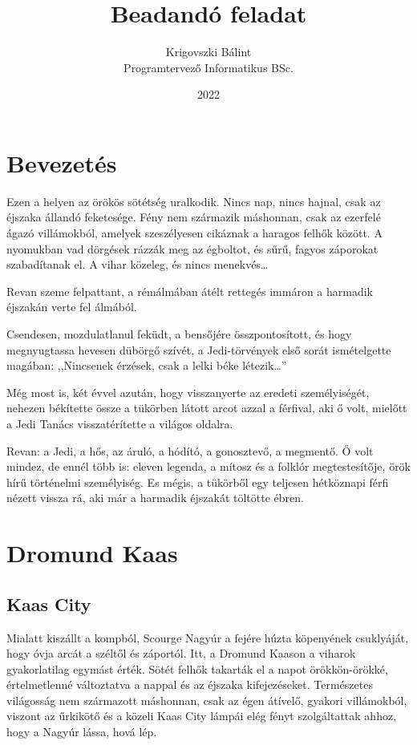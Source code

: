 \documentclass{thesis-ekf}
\theoremstyle{definition}
\begin{document}
\title{Beadandó feladat}
\author{Krigovszki Bálint\\Programtervező Informatikus BSc.}
\date{2022}
\maketitle
\tableofcontents

\chapter*{Bevezetés}
Ezen a helyen az örökös sötétség uralkodik. Nincs nap, nincs hajnal, csak az éjszaka állandó
feketesége. Fény nem származik máshonnan, csak az ezerfelé ágazó villámokból, amelyek
szeszélyesen cikáznak a haragos felhők között. A nyomukban vad dörgések rázzák meg az
égboltot, és sűrű, fagyos záporokat szabadítanak el. A vihar közeleg, és nincs menekvés\dots

Revan szeme felpattant, a rémálmában átélt rettegés immáron a harmadik éjszakán verte fel álmából.

Csendesen, mozdulatlanul feküdt, a bensőjére összpontosított, és hogy megnyugtassa
hevesen dübörgő szívét, a Jedi-törvények első sorát ismételgette magában: ,,Nincsenek
érzések, csak a lelki béke létezik\dots''
\cite{Jeffrey}

Még most is, két évvel azután, hogy visszanyerte az eredeti személyiségét, nehezen
békítette össze a tükörben látott arcot azzal a férfival, aki ő volt, mielőtt a Jedi Tanács
visszatérítette a világos oldalra.

Revan: a Jedi, a hős, az áruló, a hódító, a gonosztevő, a megmentő. Ő volt mindez, de ennél
több is: eleven legenda, a mítosz és a folklór megtestesítője, örök hírű történelmi személyiség.
Es mégis, a tükörből egy teljesen hétköznapi férfi nézett vissza rá, aki már a harmadik éjszakát
töltötte ébren.

\chapter{Dromund Kaas}
\section{Kaas City}
Mialatt kiszállt a kompból, Scourge Nagyúr a fejére húzta köpenyének csuklyáját, hogy óvja
arcát a széltől és záportól. Itt, a Dromund Kaason a viharok gyakorlatilag egymást érték. Sötét
felhők takarták el a napot örökkön-örökké, értelmetlenné változtatva a nappal és az éjszaka
kifejezéseket. Természetes világosság nem származott máshonnan, csak az égen átívelő,
gyakori villámokból, viszont az űrkikötő és a közeli Kaas City lámpái elég fényt szolgáltattak
ahhoz, hogy a Nagyúr lássa, hová lép.
\end{document}
